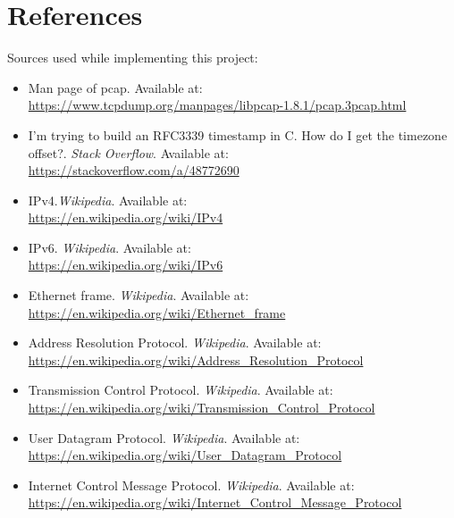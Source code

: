 \documentclass{article}
\begin{document}
\section{References}
Sources used while implementing this project:
\begin{itemize}
    \item Man page of pcap. Available at:\\
        \url{https://www.tcpdump.org/manpages/libpcap-1.8.1/pcap.3pcap.html}

    \item I'm trying to build an RFC3339 timestamp in C. How do I get the
        timezone offset?. \emph{Stack Overflow}. Available at:\\
        \url{https://stackoverflow.com/a/48772690}

    \item IPv4.\emph{Wikipedia}. Available at:\\
        \url{https://en.wikipedia.org/wiki/IPv4}

    \item IPv6. \emph{Wikipedia}. Available at:\\
        \url{https://en.wikipedia.org/wiki/IPv6}

    \item Ethernet frame. \emph{Wikipedia}. Available at:\\
        \url{https://en.wikipedia.org/wiki/Ethernet_frame}

    \item Address Resolution Protocol. \emph{Wikipedia}. Available at:\\
        \url{https://en.wikipedia.org/wiki/Address_Resolution_Protocol}

    \item Transmission Control Protocol. \emph{Wikipedia}. Available at:\\
        \url{https://en.wikipedia.org/wiki/Transmission_Control_Protocol}

    \item User Datagram Protocol. \emph{Wikipedia}. Available at:\\
        \url{https://en.wikipedia.org/wiki/User_Datagram_Protocol}

    \item Internet Control Message Protocol. \emph{Wikipedia}. Available at:\\
        \url{https://en.wikipedia.org/wiki/Internet_Control_Message_Protocol}

\end{itemize}
\end{document}
